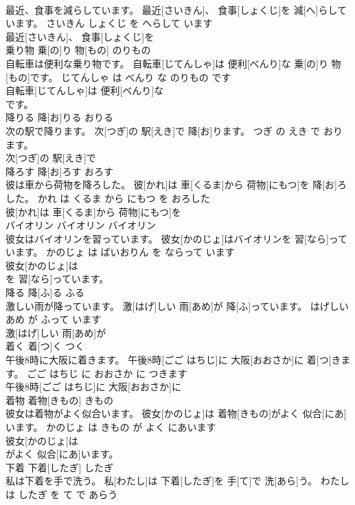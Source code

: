\documentclass[8pt]{extreport}
\begin{document}
\begin{CJK}{UTF8}{min}
\\	最近、食事を減らしています。	最近[さいきん]、 食事[しょくじ]を 減[へ]らしています。	さいきん しょくじ を へらして います	
\\	最近[さいきん]、 食事[しょくじ]を
\\	乗り物	乗[の]り 物[もの]	のりもの	
\\	自転車は便利な乗り物です。	自転車[じてんしゃ]は 便利[べんり]な 乗[の]り 物[もの]です。	じてんしゃ は べんり な のりもの です	
\\	自転車[じてんしゃ]は 便利[べんり]な
\\	です。		
\\	降りる	降[お]りる	おりる	
\\	次の駅で降ります。	次[つぎ]の 駅[えき]で 降[お]ります。	つぎ の えき で おります。	
\\	次[つぎ]の 駅[えき]で
\\	降ろす	降[お]ろす	おろす	
\\	彼は車から荷物を降ろした。	彼[かれ]は 車[くるま]から 荷物[にもつ]を 降[お]ろした。	かれ は くるま から にもつ を おろした	
\\	彼[かれ]は 車[くるま]から 荷物[にもつ]を
\\	バイオリン	バイオリン	バイオリン	
\\	彼女はバイオリンを習っています。	彼女[かのじょ]はバイオリンを 習[なら]っています。	かのじょ は ばいおりん を ならって います	
\\	彼女[かのじょ]は
\\	を 習[なら]っています。		
\\	降る	降[ふ]る	ふる	
\\	激しい雨が降っています。	激[はげ]しい 雨[あめ]が 降[ふ]っています。	はげしい あめ が ふって います	
\\	激[はげ]しい 雨[あめ]が
\\	着く	着[つ]く	つく	
\\	午後8時に大阪に着きます。	午後8時[ごご はちじ]に 大阪[おおさか]に 着[つ]きます。	ごご はちじ に おおさか に つきます	
\\	午後8時[ごご はちじ]に 大阪[おおさか]に
\\	着物	着物[きもの]	きもの	
\\	彼女は着物がよく似合います。	彼女[かのじょ]は 着物[きもの]がよく 似合[にあ]います。	かのじょ は きもの が よく にあいます	
\\	彼女[かのじょ]は
\\	がよく 似合[にあ]います。		
\\	下着	下着[したぎ]	したぎ	
\\	私は下着を手で洗う。	私[わたし]は 下着[したぎ]を 手[て]で 洗[あら]う。	わたし は したぎ を て で あらう	

\end{CJK}
\end{document}
